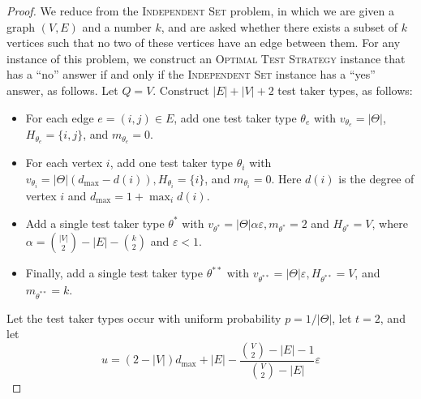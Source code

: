 \documentclass{article}
\begin{document}
\begin{proof}
  We reduce from the \textsc{Independent Set} problem, in which we are
  given a graph $(V,E)$ and a number $k$, and are asked whether there
  exists a subset of $k$ vertices such that no two of these vertices have
  an edge between them.  For any instance of this problem, we construct an 
\textsc{Optimal Test Strategy} instance that has a ``no'' answer if and
only if the \textsc{Independent Set} instance has a ``yes'' answer,
as follows.  
Let $Q=V$.
Construct $|E|+|V|+2$ test taker types, as follows:
\begin{itemize}
\item For each edge $e = (i, j) \in E$, add one test taker type $\theta_e$ with
$v_{\theta_e} = |\Theta|$, $H_{\theta_e} = \{i, j\}$, and $m_{\theta_e} = 0$.

\item For each vertex $i$, add one test taker type  $\theta_i$ with $v_{\theta_i} =
|\Theta| (d_{\text{max}}-d(i)), H_{\theta_i} = \{i\}$, and $m_{\theta_i} = 0$. Here
$d(i)$ is the degree of vertex $i$ and $d_{\text{max}} = 1 + \max_i d(i)$.

\item Add a single test taker type 
$\theta^*$ with $v_{\theta^*} =
|\Theta| \alpha \varepsilon, m_{\theta^*} = 2$ and $H_{\theta^*} = V$, where $\alpha =
\binom{|V|}{2} - |E|-\binom{k}{2}$ and $\varepsilon < 1$.

\item Finally, add a single test taker type $\theta^{**}$ with $v_{\theta^{**}} =
|\Theta|  \varepsilon, H_{\theta^{**}} = V$, and $m_{\theta^{**}} = k$.
\end{itemize}
Let the test taker types occur with uniform probability $p=1/|\Theta|$, let
$t=2$, and
let 
$$u= (2-|V|)d_{\text{max}} + |E| - \frac{{V  \choose 2}-|E|-1}{{V \choose 2}-|E|}\varepsilon$$






\end{proof}
\end{document}
